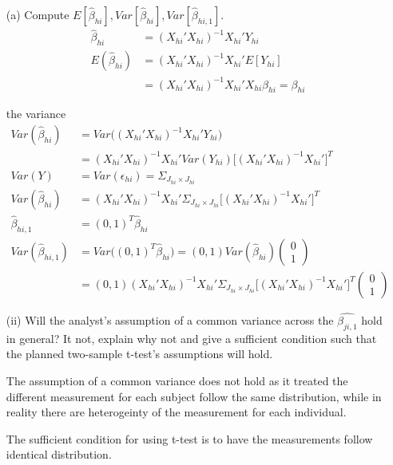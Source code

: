 \documentclass[11pt]{article} %
\begin{document}
\begin{itemize}[]
	
	\item[(a)] Compute $E[\hat{\beta}_{hi} ], Var[\hat{\beta}_{hi} ], Var[\hat{\beta}_{hi,1} ]$. 
\begin{align*}
		\hat{\beta}_{hi} &= (X_{hi}' X_{hi})^{-1} X_{hi}' Y_{hi} \\
	E(\hat{\beta}_{hi}) &= (X_{hi}' X_{hi})^{-1} X_{hi}' E[Y_{hi}] \\
	& =  (X_{hi}' X_{hi})^{-1} X_{hi}' X_{hi} \beta_{hi} =\beta_{hi} 
\end{align*}	

the variance 
\begin{align*}
	Var(\hat{\beta}_{hi}) &= Var \Big((X_{hi}' X_{hi})^{-1} X_{hi}' Y_{hi} \Big) \\
	&= (X_{hi}' X_{hi})^{-1} X_{hi}' Var(Y_{hi}) \Big[ (X_{hi}' X_{hi})^{-1} X_{hi}' \Big]^T \\
	Var(Y) &= Var(\epsilon_{hi})= \Sigma_{J_{hi} \times J_{hi}}\\
	Var(\hat{\beta}_{hi})  & =  (X_{hi}' X_{hi})^{-1} X_{hi}' \Sigma_{J_{hi} \times J_{hi}} \Big[ (X_{hi}' X_{hi})^{-1} X_{hi}' \Big]^T \\
	\hat{\beta}_{hi,1} &= (0,1)^T \hat{\beta}_{hi} \\
	Var(\hat{\beta}_{hi,1}) &= Var \Big((0,1)^T \hat{\beta}_{hi} \Big) = (0,1) Var(\hat{\beta}_{hi}) \begin{pmatrix}
		0 \\
		1
	\end{pmatrix} \\
&= (0,1) (X_{hi}' X_{hi})^{-1} X_{hi}' \Sigma_{J_{hi} \times J_{hi}} \Big[ (X_{hi}' X_{hi})^{-1} X_{hi}' \Big]^T  \begin{pmatrix}
	0 \\
	1
\end{pmatrix} 
\end{align*}		

\item[(ii)] Will the analyst's assumption of a common variance across the $\hat{\beta_{ji,1}}$ hold in general? It not, explain why not and give a sufficient condition such that the planned two-sample t-test's assumptions will hold.

The assumption of a common variance does not hold as it treated the different measurement for each subject follow the same distribution, while in reality there are heterogeinty of the measurement for each individual. 

The sufficient condition for using t-test is to have the measurements follow identical distribution.

\end{itemize}
\end{document}

